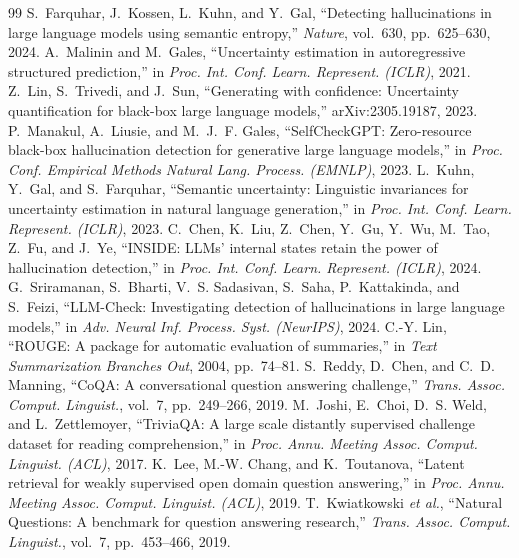 \documentclass[conference]{IEEEtran}
\begin{document}
\begin{thebibliography}{99}
 S.~Farquhar, J.~Kossen, L.~Kuhn, and Y.~Gal, ``Detecting hallucinations in large language models using semantic entropy,'' \emph{Nature}, vol.~630, pp.~625--630, 2024.
 A.~Malinin and M.~Gales, ``Uncertainty estimation in autoregressive structured prediction,'' in \emph{Proc. Int. Conf. Learn. Represent. (ICLR)}, 2021.
 Z.~Lin, S.~Trivedi, and J.~Sun, ``Generating with confidence: Uncertainty quantification for black-box large language models,'' arXiv:2305.19187, 2023.
 P.~Manakul, A.~Liusie, and M.~J.~F. Gales, ``SelfCheckGPT: Zero-resource black-box hallucination detection for generative large language models,'' in \emph{Proc. Conf. Empirical Methods Natural Lang. Process. (EMNLP)}, 2023.
 L.~Kuhn, Y.~Gal, and S.~Farquhar, ``Semantic uncertainty: Linguistic invariances for uncertainty estimation in natural language generation,'' in \emph{Proc. Int. Conf. Learn. Represent. (ICLR)}, 2023.
 C.~Chen, K.~Liu, Z.~Chen, Y.~Gu, Y.~Wu, M.~Tao, Z.~Fu, and J.~Ye, ``INSIDE: LLMs' internal states retain the power of hallucination detection,'' in \emph{Proc. Int. Conf. Learn. Represent. (ICLR)}, 2024.
 G.~Sriramanan, S.~Bharti, V.~S. Sadasivan, S.~Saha, P.~Kattakinda, and S.~Feizi, ``LLM-Check: Investigating detection of hallucinations in large language models,'' in \emph{Adv. Neural Inf. Process. Syst. (NeurIPS)}, 2024.
 C.-Y. Lin, ``ROUGE: A package for automatic evaluation of summaries,'' in \emph{Text Summarization Branches Out}, 2004, pp.~74--81.
 S.~Reddy, D.~Chen, and C.~D. Manning, ``CoQA: A conversational question answering challenge,'' \emph{Trans. Assoc. Comput. Linguist.}, vol.~7, pp.~249--266, 2019.
 M.~Joshi, E.~Choi, D.~S. Weld, and L.~Zettlemoyer, ``TriviaQA: A large scale distantly supervised challenge dataset for reading comprehension,'' in \emph{Proc. Annu. Meeting Assoc. Comput. Linguist. (ACL)}, 2017.
 K.~Lee, M.-W. Chang, and K.~Toutanova, ``Latent retrieval for weakly supervised open domain question answering,'' in \emph{Proc. Annu. Meeting Assoc. Comput. Linguist. (ACL)}, 2019.
 T.~Kwiatkowski \emph{et al.}, ``Natural Questions: A benchmark for question answering research,'' \emph{Trans. Assoc. Comput. Linguist.}, vol.~7, pp.~453--466, 2019.

\end{thebibliography}
\end{document}
